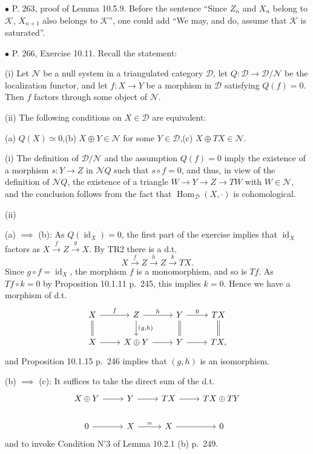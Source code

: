 \documentclass[12pt]{article}
\theoremstyle{remark}%
\newcommand{\bu}{\bullet}
\newcommand{\n}{\noindent}
\newcommand{\cc}{\mathcal}
\newcommand{\xr}{\xrightarrow}
\DeclareMathOperator{\id}{id}
\DeclareMathOperator{\h}{Hom}
\begin{document}

\n$\bu$ P. 263, proof of Lemma 10.5.9. Before the sentence ``Since $Z_n$  and $X_n$ belong to $\cc K$, $X_{n+1}$ also belongs to $\cc K$'', one could add ``We may, and do, assume that $\cc K$ is saturated''. 


\n$\bu$ P. 266, Exercise 10.11. Recall the statement: 

\n(i) Let $\cc N$ be a null system in a triangulated category $\cc D$, let $Q:\cc D\to\cc D/\cc N$ be the localization functor, and let $f:X\to Y$ be a morphism in $\cc D$ satisfying $Q(f)=0$. Then $f$ factors through some object of $\cc N$. 

\n(ii) The following conditions on $X\in\cc D$ are equivalent: 

\n(a) $Q(X)\simeq0$,\quad(b) $X\oplus Y\in\cc N$ for some $Y\in\cc D$,\quad(c) $X\oplus TX\in\cc N$.

\n{\em Proof.} 

\n(i) The definition of $\cc D/\cc N$ and the assumption $Q(f)=0$ imply the existence of a morphism $s:Y\to Z$ in $\cc NQ$ such that $s\circ f=0$, and thus, in view of the definition of $\cc NQ$, the existence of a triangle $W\to Y\to Z\to TW$ with $W\in\cc N$, and the conclusion follows from the fact that $\h_{\cc D}(X,\cdot)$ is cohomological. 

\n(ii)

\n(a) $\implies$ (b): As $Q(\id_X)=0$, the first part of the exercise implies that $\id_X$ factors as $X\xr fZ\xr g X$. By TR2 there is a d.t. 
$$
X\xr fZ\xr hZ\xr kTX.
$$ 
Since $g\circ f=\id_X$, the morphism $f$ is a monomorphism, and so is $Tf$. As $Tf\circ k=0$ by Proposition 10.1.11 p.~245, this implies $k=0$. Hence we have a morphism of d.t.  
$$
\begin{tikzcd}
X\ar[equal]{d}\ar{r}{f}&Z\ar{d}{(g,h)}\ar{r}{h}&Y\ar[equal]{d}\ar{r}{0}&TX\ar[equal]{d}\\ 
X\ar{r}&X\oplus Y\ar{r}&Y\ar{r}&TX,
\end{tikzcd}
$$
and Proposition 10.1.15 p.~246 implies that $(g,h)$ is an isomorphism.\bigskip 

\n(b) $\implies$ (c): It suffices to take the direct sum of the d.t. 
$$
\begin{tikzcd} 
X\oplus Y\ar{r}&Y\ar{r}&TX\ar{r}&TX\oplus TY\\ 
0\ar{r}&X\ar{r}{=}&X\ar{r}&0
\end{tikzcd}
$$
and to invoke Condition N'3 of Lemma 10.2.1 (b) p.~249. 
\end{document}
